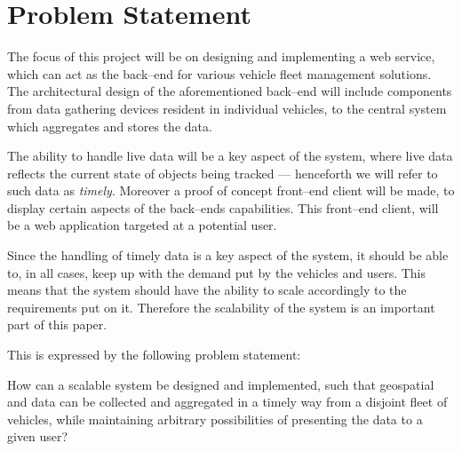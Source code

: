 \section{Problem Statement}\label{sec:problem_statement}

The focus of this project will be on designing and implementing a web service,
which can act as the back--end for various vehicle fleet management solutions.
The architectural design of the aforementioned back--end will include components
from data gathering devices resident in individual vehicles,
to the central system which aggregates and stores the data.

The ability to handle live data will be a key aspect of the system,
where live data reflects the current state of objects being tracked
--- henceforth we will refer to such data as \textit{timely}.
Moreover a proof of concept front--end client will be made,
to display certain aspects of the back--ends capabilities.
This front--end client, will be a web application targeted at a potential user.

Since the handling of timely data is a key aspect of the system,
it should be able to, in all cases, keep up with the demand put by the vehicles and users.
This means that the system should have the ability to scale accordingly to the requirements put on it.
Therefore the scalability of the system is an important part of this paper.

\bigskip\noindent
This is expressed by the following problem statement:

\medskip
{\addtolength{\leftskip}{10mm}\addtolength{\rightskip}{10mm}\noindent\hrulefill\it

\noindent How can a scalable system be designed and implemented,
such that geospatial and data can be collected and aggregated in a timely way from a disjoint fleet of vehicles,
while maintaining arbitrary possibilities of presenting the data to a given user?

\noindent\hrulefill

}
